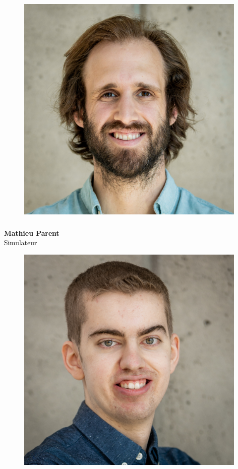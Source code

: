 \documentclass[a0paper,portrait]{baposter}
\begin{document}
\begin{poster}
{\begin{figure}
\includegraphics[width=.9\linewidth]{img/membres/Mathieu-Parent-2.jpg} 
\end{figure}
\subsubsection*{}
\vspace{2mm}
\textbf{Mathieu Parent}\\
Simulateur

\begin{figure}
\includegraphics[width=.9\linewidth]{img/membres/Gabriel-Quirion-3.jpg} 
\end{figure}
}
\end{poster}
\end{document}
